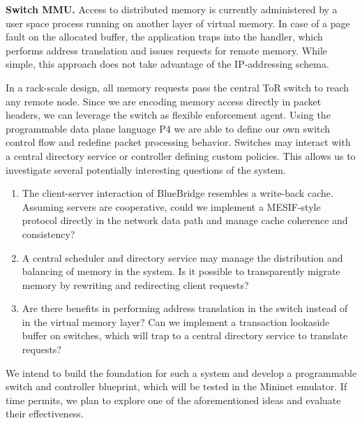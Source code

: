 \textbf{Switch MMU.} Access to distributed memory is
currently administered by a user space process running on another layer of
virtual memory. In case of a page fault on the allocated buffer, the application
traps into the handler, which performs address translation and issues requests
for remote memory. While simple, this approach does not take advantage of the
IP-addressing schema.

In a rack-scale design, all memory requests pass the central ToR switch to reach
any remote node. Since we are encoding memory access directly in packet headers,
we can leverage the switch as flexible enforcement agent. Using the programmable
data plane language P4 we are able to define our own switch control flow and
redefine packet processing behavior. Switches may interact with a central
directory service or controller defining custom policies. This allows us to
investigate several potentially interesting questions of the system.
\begin{enumerate}
\item The client-server interaction of BlueBridge resembles a write-back cache.
Assuming servers are cooperative, could we implement a MESIF-style protocol
directly in the network data path and manage cache coherence and consistency?
\item A central scheduler and directory service may manage the distribution and
balancing of memory in the system. Is it possible to transparently migrate
memory by rewriting and redirecting client requests?
\item Are there benefits in performing address translation in the switch instead
of in the virtual memory layer? Can we implement a transaction lookaside buffer
on switches, which will trap to a central directory service to translate requests?

\end{enumerate}
We intend to build the foundation for such a system and develop a programmable
switch and controller blueprint, which will be tested in the Mininet emulator.
If time permits, we plan to explore one of the aforementioned ideas and evaluate
their effectiveness.

